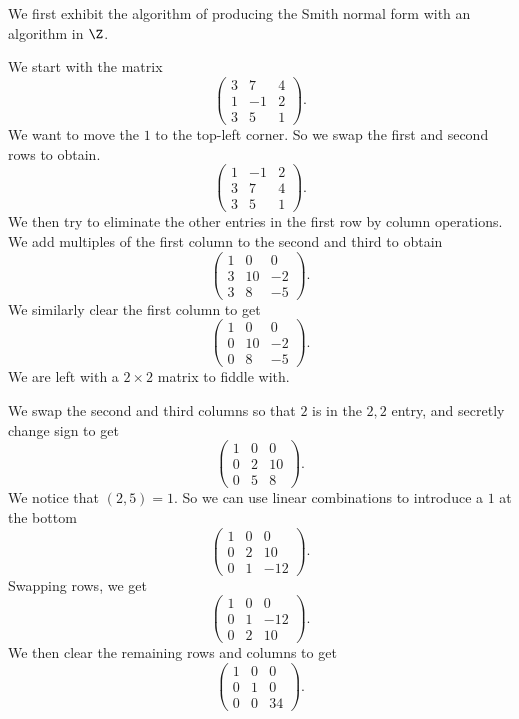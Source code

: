 \documentclass[a4paper]{article}
\begin{document}
We first exhibit the algorithm of producing the Smith normal form with an algorithm in $\Z$.
\begin{eg}
  We start with the matrix
  \[
    \begin{pmatrix}
      3 & 7 & 4\\
      1 & -1 & 2\\
      3 & 5 & 1
    \end{pmatrix}.
  \]
  We want to move the $1$ to the top-left corner. So we swap the first and second rows to obtain.
  \[
    \begin{pmatrix}
      1 & -1 & 2\\
      3 & 7 & 4\\
      3 & 5 & 1
    \end{pmatrix}.
  \]
  We then try to eliminate the other entries in the first row by column operations. We add multiples of the first column to the second and third to obtain
  \[
    \begin{pmatrix}
      1 & 0 & 0\\
      3 & 10 & -2\\
      3 & 8 & -5
    \end{pmatrix}.
  \]
  We similarly clear the first column to get
  \[
    \begin{pmatrix}
      1 & 0 & 0\\
      0 & 10 & -2\\
      0 & 8 & -5
    \end{pmatrix}.
  \]
  We are left with a $2\times 2$ matrix to fiddle with.

  We swap the second and third columns so that $2$ is in the $2, 2$ entry, and secretly change sign to get
  \[
    \begin{pmatrix}
      1 & 0 & 0\\
      0 & 2 & 10\\
      0 & 5 & 8
    \end{pmatrix}.
  \]
  We notice that $(2, 5) = 1$. So we can use linear combinations to introduce a $1$ at the bottom
  \[
    \begin{pmatrix}
      1 & 0 & 0\\
      0 & 2 & 10\\
      0 & 1 & -12
    \end{pmatrix}.
  \]
  Swapping rows, we get
  \[
    \begin{pmatrix}
      1 & 0 & 0\\
      0 & 1 & -12\\
      0 & 2 & 10
    \end{pmatrix}.
  \]
  We then clear the remaining rows and columns to get
  \[
    \begin{pmatrix}
      1 & 0 & 0\\
      0 & 1 & 0\\
      0 & 0 & 34
    \end{pmatrix}.
  \]
\end{eg}
\end{document}
